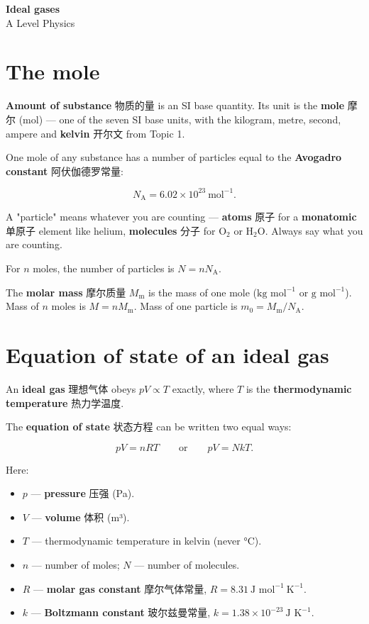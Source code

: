 \documentclass[11pt]{article}
\begin{document}
\begin{center}
  {\LARGE\bfseries Ideal gases}\\[0.35em]
  {\large A Level Physics}
\end{center}
\vspace{0.6em}

\section*{The mole}

\textbf{Amount of substance} 物质的量 is an SI base quantity. Its unit is the \textbf{mole} 摩尔 (mol) — one of the seven SI base units, with the kilogram, metre, second, ampere and \textbf{kelvin} 开尔文 from Topic 1.

One mole of any substance has a number of particles equal to the \textbf{Avogadro constant} 阿伏伽德罗常量:

\[
N_{\text{A}} = 6.02 \times 10^{23}\ \text{mol}^{-1}.
\]

A "particle" means whatever you are counting — \textbf{atoms} 原子 for a \textbf{monatomic} 单原子 element like helium, \textbf{molecules} 分子 for $\text{O}_{2}$ or $\text{H}_{2}\text{O}$. Always say what you are counting.

For $n$ moles, the number of particles is $N = n N_{\text{A}}$.

The \textbf{molar mass} 摩尔质量 $M_{\text{m}}$ is the mass of one mole ($\text{kg mol}^{-1}$ or $\text{g mol}^{-1}$). Mass of $n$ moles is $M = n M_{\text{m}}$. Mass of one particle is $m_{0} = M_{\text{m}} / N_{\text{A}}$.

\section*{Equation of state of an ideal gas}

An \textbf{ideal gas} 理想气体 obeys $pV \propto T$ exactly, where $T$ is the \textbf{thermodynamic temperature} 热力学温度.

The \textbf{equation of state} 状态方程 can be written two equal ways:

\[
p V = n R T \qquad\text{or}\qquad p V = N k T.
\]

Here:

\begin{itemize}
\item $p$ — \textbf{pressure} 压强 (Pa).

\item $V$ — \textbf{volume} 体积 (m³).

\item $T$ — thermodynamic temperature in kelvin (never °C).

\item $n$ — number of moles; $N$ — number of molecules.

\item $R$ — \textbf{molar gas constant} 摩尔气体常量, $R = 8.31\ \text{J mol}^{-1}\ \text{K}^{-1}$.

\item $k$ — \textbf{Boltzmann constant} 玻尔兹曼常量, $k = 1.38 \times 10^{-23}\ \text{J K}^{-1}$.

\end{itemize}
\end{document}
